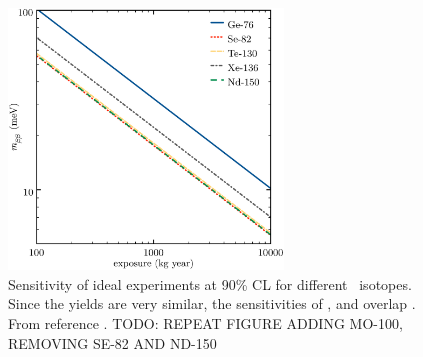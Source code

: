 \begin{figure}[t!b!]
\begin{center}
\includegraphics[width=0.65\textwidth]{img/isotopes_sensi.eps}
\end{center}
\caption{Sensitivity of ideal experiments at 90\% CL for different \bb\ isotopes. Since the yields are very similar, the sensitivities of ,  and  overlap . From reference \cite{Gomez-Cadenas:2010zcc}. TODO: REPEAT FIGURE ADDING MO-100, REMOVING SE-82 AND ND-150} \label{fig:SensiIdeal}	
\end{figure}

